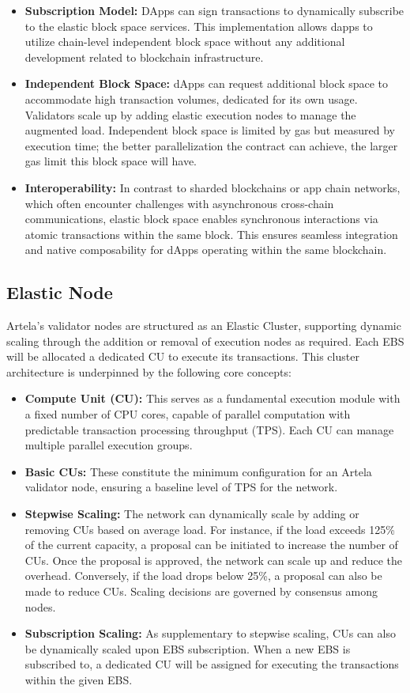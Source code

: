\begin{itemize}
\item \textbf{Subscription Model:} DApps can sign transactions to dynamically subscribe to the elastic block space services. This implementation allows dapps to utilize chain-level independent block space without any additional development related to blockchain infrastructure.
\item \textbf{Independent Block Space:} dApps can request additional block space to accommodate high transaction volumes, dedicated for its own usage. Validators scale up by adding elastic execution nodes to manage the augmented load. Independent block space is limited by gas but measured by execution time; the better parallelization the contract can achieve, the larger gas limit this block space will have.
\item \textbf{Interoperability:} In contrast to sharded blockchains or app chain networks, which often encounter challenges with asynchronous cross-chain communications, elastic block space enables synchronous interactions via atomic transactions within the same block. This ensures seamless integration and native composability for dApps operating within the same blockchain.
\end{itemize}

\subsection{Elastic Node}

Artela's validator nodes are structured as an Elastic Cluster, supporting dynamic scaling through the addition or removal of execution nodes as required. Each EBS will be allocated a dedicated CU to execute its transactions. This cluster architecture is underpinned by the following core concepts:

\begin{itemize}
\item \textbf{Compute Unit (CU):} This serves as a fundamental execution module with a fixed number of CPU cores, capable of parallel computation with predictable transaction processing throughput (TPS). Each CU can manage multiple parallel execution groups.
\item \textbf{Basic CUs:} These constitute the minimum configuration for an Artela validator node, ensuring a baseline level of TPS for the network.
\item \textbf{Stepwise Scaling:} The network can dynamically scale by adding or removing CUs based on average load. For instance, if the load exceeds 125\% of the current capacity, a proposal can be initiated to increase the number of CUs. Once the proposal is approved, the network can scale up and reduce the overhead. Conversely, if the load drops below 25\%, a proposal can also be made to reduce CUs. Scaling decisions are governed by consensus among nodes.
\item \textbf{Subscription Scaling:} As supplementary to stepwise scaling, CUs can also be dynamically scaled upon EBS subscription. When a new EBS is subscribed to, a dedicated CU will be assigned for executing the transactions within the given EBS.
\end{itemize}

